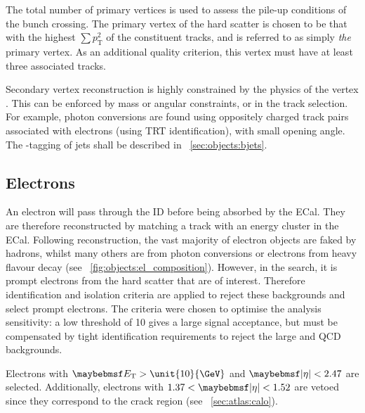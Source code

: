 The total number of primary vertices \npv is used to assess the pile-up conditions of 
the bunch crossing. The primary vertex of the hard scatter is chosen to be that with the 
highest $\sum p_{\text{T}}^2$ of the constituent tracks, and is referred to as simply \textit{the} 
primary vertex. As an additional quality criterion, this vertex must have at least three 
associated tracks.

Secondary vertex reconstruction is highly constrained by the physics of the vertex 
\cite{AllVertexFinding}. This can be enforced by mass or angular constraints, or in the 
track selection. For example, photon conversions are found using oppositely charged 
track pairs associated with electrons (using \acs{TRT} identification), with small 
opening angle. 
The \Pbottom-tagging of jets shall be described in \Section~\ref{sec:objects:bjets}.



\subsection{Electrons}
\label{sec:objects:electrons}

An electron will pass through the \ac{ID} before being absorbed by the \ac{ECal}. They 
are therefore reconstructed by matching a track with an energy cluster in the \ac{ECal}. 
Following reconstruction, the vast majority of electron objects are faked by hadrons, 
whilst many others are from photon conversions or electrons from heavy flavour decay (see 
\Figure~\ref{fig:objects:el_composition}). However, in the \HWWlvlv search, it is prompt 
electrons from the hard scatter that are of interest. Therefore identification and 
isolation criteria are applied to reject these backgrounds and select prompt electrons. 
The criteria were chosen to optimise the analysis sensitivity: \eg a low \et threshold 
of \unit{10}{\GeV} gives a large signal acceptance, but must be compensated by tight 
identification requirements to reject the large \Wjets and QCD backgrounds.

Electrons with $\et > \unit{10}{\GeV}$ and $\mods{\eta} < 2.47$ are selected. Additionally, electrons with $1.37 < \mods{\eta} < 1.52$ are vetoed since they correspond
to the crack region (see \Section~\ref{sec:atlas:calo}).

